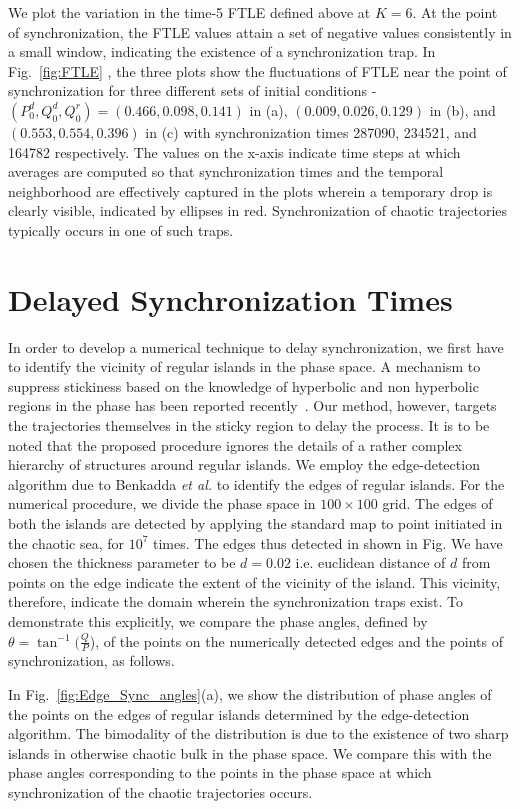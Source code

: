\documentclass[reprint,superscriptaddress,amsmath,amssymb,aps,pre]{revtex4-1}
\begin{document}
We plot the variation in the time-5 FTLE defined above at $K = 6$. At the point of synchronization, the FTLE values attain a set of negative values consistently in a small window, indicating the existence of a synchronization trap.  In Fig.~\ref{fig:FTLE} , the three plots show the fluctuations  of FTLE near the point of synchronization for three different sets of initial conditions - $(P^d_0,Q^d_0,Q^r_0) = (0.466,0.098,0.141)$ in (a),  $(0.009,0.026,0.129)$ in (b), and $(0.553,0.554,0.396)$ in (c) with synchronization times 287090, 234521, and 164782 respectively. The values on the x-axis indicate time steps at which averages are computed so that synchronization times and the temporal neighborhood are effectively captured in the plots wherein a temporary drop is clearly visible, indicated by ellipses in red. Synchronization of chaotic trajectories typically occurs in one of such traps. 

\section{Delayed Synchronization Times}
\label{sec:delay}
In order to develop a numerical technique to delay synchronization, we  first 
have to identify the vicinity of regular islands in the phase space. A 
mechanism  to suppress stickiness based on the knowledge of hyperbolic and non 
hyperbolic regions in the phase has been reported recently~\cite{Kruger2015}. 
Our method, however, targets the trajectories themselves in the sticky region 
to delay the process.  It is to be noted that the proposed procedure ignores 
the details of a rather complex hierarchy of structures around regular 
islands. We employ the edge-detection algorithm due to Benkadda {\it et al.} 
\cite{Benkadda1997} to identify the edges of regular islands. For the 
numerical procedure, we divide the phase space in $100 \times 100$ grid. The 
edges of both the islands are detected by applying the standard map to point 
initiated in the chaotic sea, for $10^7$ times.  The edges thus detected in 
shown in Fig.  We have chosen the thickness parameter to be $d =0.02$ i.e. 
euclidean distance of $d$ from points on the edge indicate the extent of the 
vicinity of the island.  This vicinity, therefore, indicate the domain wherein 
the synchronization traps exist.  To demonstrate this explicitly, we compare 
the phase angles, defined by $\theta = \tan^{-1}(\frac{Q}{P}$), of the points 
on 
the numerically detected edges and the points of synchronization, as follows.

In Fig.~\ref{fig:Edge_Sync_angles}(a), we show the distribution of phase angles of the points on the edges of regular islands determined by the edge-detection algorithm.  The bimodality of the distribution is due to the existence of two sharp islands in otherwise chaotic bulk in the phase space.  We compare this with the phase angles corresponding to the points in the phase space at which synchronization of the chaotic trajectories occurs.
\end{document}
